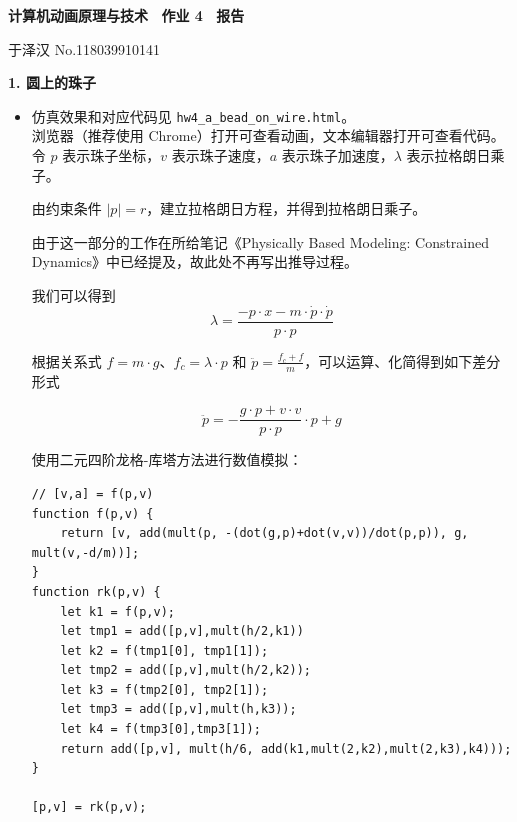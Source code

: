 \documentclass[a4paper, 12pt]{article}
\begin{document}
\begin{center}
{\bfseries {计算机动画原理与技术 ~作业 4 ~报告}}

\vspace{0.5\baselineskip}

{ \kaishu 于泽汉 \hspace{1em} \textsf{No.118039910141}}
\end{center}

\textbf{1. 圆上的珠子}

\begin{itemize}[leftmargin=2em, label={}]

\item 仿真效果和对应代码见 \texttt{hw4\_a\_bead\_on\_wire.html}。\\
浏览器（推荐使用 Chrome）打开可查看动画，文本编辑器打开可查看代码。\\[-2ex]

令 $p$ 表示珠子坐标，$v$ 表示珠子速度，$a$ 表示珠子加速度，$\lambda$ 表示拉格朗日乘子。

由约束条件 $|p| = r$，建立拉格朗日方程，并得到拉格朗日乘子。

由于这一部分的工作在所给笔记《Physically Based Modeling: Constrained Dynamics》中已经提及，故此处不再写出推导过程。

我们可以得到
$$\lambda = \frac{-p \cdot x - m \cdot \dot{p} \cdot \dot{p}}{p \cdot p}$$

根据关系式 $f=m\cdot g$、$f_c=\lambda \cdot p$ 和 $\ddot{p}=\frac{f_c+f}{m}$，可以运算、化简得到如下差分形式

$$\ddot{p} = -\frac{g \cdot p + v \cdot v}{p \cdot p} \cdot p +g$$

\vspace{0.5\baselineskip}

使用二元四阶龙格-库塔方法进行数值模拟：

\vspace{\baselineskip}

\begin{lstlisting}[style=myC]
// [v,a] = f(p,v)
function f(p,v) {
    return [v, add(mult(p, -(dot(g,p)+dot(v,v))/dot(p,p)), g, mult(v,-d/m))];
}
function rk(p,v) {
    let k1 = f(p,v);
    let tmp1 = add([p,v],mult(h/2,k1))
    let k2 = f(tmp1[0], tmp1[1]);
    let tmp2 = add([p,v],mult(h/2,k2));
    let k3 = f(tmp2[0], tmp2[1]);
    let tmp3 = add([p,v],mult(h,k3));
    let k4 = f(tmp3[0],tmp3[1]);
    return add([p,v], mult(h/6, add(k1,mult(2,k2),mult(2,k3),k4)));
}

[p,v] = rk(p,v);
\end{lstlisting}
\end{itemize}
\end{document}

